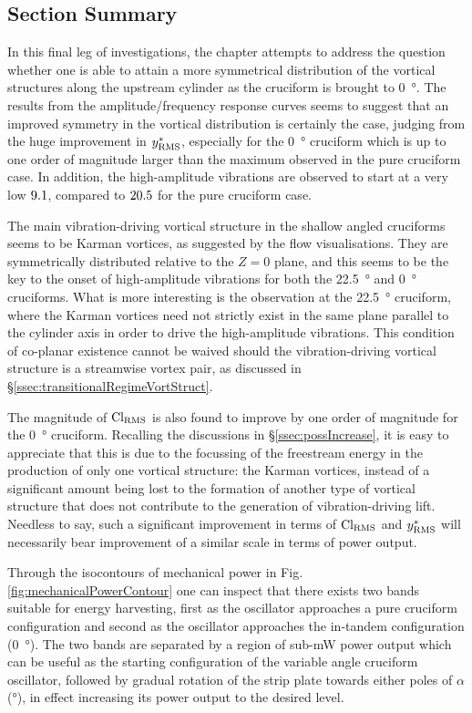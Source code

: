 \documentclass[oneside]{utmthesis}
\begin{document}
\subsection{Section Summary} \label{ssec:chapSumShallow}
In this final leg of investigations, the chapter attempts to address the question whether one is able to attain a more symmetrical distribution of the vortical structures along the upstream cylinder as the cruciform is brought to \SI{0}{\degree}. The results from the amplitude/frequency response curves seems to suggest that an improved symmetry in the vortical distribution is certainly the case, judging from the huge improvement in $y^{*}_{\text{RMS}}$, especially for the \SI{0}{\degree} cruciform which is up to one order of magnitude larger than the maximum observed in the pure cruciform case. In addition, the high-amplitude vibrations are observed to start at a very low $9.1$, compared to $20.5$ for the pure cruciform case.

The main vibration-driving vortical structure in the shallow angled cruciforms seems to be Karman vortices, as suggested by the flow visualisations. They are symmetrically distributed relative to the $Z=0$ plane, and this seems to be the key to the onset of high-amplitude vibrations for both the \SI{22.5}{\degree} and \SI{0}{\degree} cruciforms. What is more interesting is the observation at the \SI{22.5}{\degree} cruciform, where the Karman vortices need not strictly exist in the same plane parallel to the cylinder axis in order to drive the high-amplitude vibrations. This condition of co-planar existence cannot be waived should the vibration-driving vortical structure is a streamwise vortex pair, as discussed in \S\ref{ssec:transitionalRegimeVortStruct}.

The magnitude of $\text{Cl}_{\text{RMS}}$ is also found to improve by one order of magnitude for the \SI{0}{\degree} cruciform. Recalling the discussions in \S\ref{ssec:possIncrease}, it is easy to appreciate that this is due to the focussing of the freestream energy in the production of only one vortical structure: the Karman vortices, instead of a significant amount being lost to the formation of another type of vortical structure that does not contribute to the generation of vibration-driving lift. Needless to say, such a significant improvement in terms of $\text{Cl}_{\text{RMS}}$ and $y^{*}_{\text{RMS}}$ will necessarily bear improvement of a similar scale in terms of power output.

Through the isocontours of mechanical power in Fig. \ref{fig:mechanicalPowerContour} one can inspect that there exists two bands suitable for energy harvesting, first as the oscillator approaches a pure cruciform configuration and second as the oscillator approaches the in-tandem configuration (\SI{0}{\degree}). The two bands are separated by a region of sub-mW power output which can be useful as the starting configuration of the variable angle cruciform oscillator, followed by gradual rotation of the strip plate towards either poles of $\alpha$ (\si{\degree}), in effect increasing its power output to the desired level.
\end{document}
